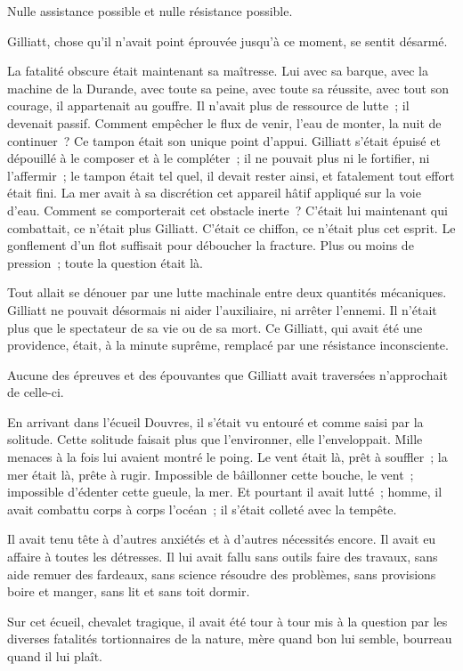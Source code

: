 \documentclass[french,twoside]{book} %
\begin{document}
Nulle assistance possible et nulle résistance possible.\par
 Gilliatt, chose qu’il n’avait point éprouvée jusqu’à ce moment, se sentit désarmé.\par
La fatalité obscure était maintenant sa maîtresse. Lui avec sa barque, avec la machine de la Durande, avec toute sa peine, avec toute sa réussite, avec tout son courage, il appartenait au gouffre. Il n’avait plus de ressource de lutte ; il devenait passif. Comment empêcher le flux de venir, l’eau de monter, la nuit de continuer ? Ce tampon était son unique point d’appui. Gilliatt s’était épuisé et dépouillé à le composer et à le compléter ; il ne pouvait plus ni le fortifier, ni l’affermir ; le tampon était tel quel, il devait rester ainsi, et fatalement tout effort était fini. La mer avait à sa discrétion cet appareil hâtif appliqué sur la voie d’eau. Comment se comporterait cet obstacle inerte ? C’était lui maintenant qui combattait, ce n’était plus Gilliatt. C’était ce chiffon, ce n’était plus cet esprit. Le gonflement d’un flot suffisait pour déboucher la fracture. Plus ou moins de pression ; toute la question était là.\par
Tout allait se dénouer par une lutte machinale entre deux quantités mécaniques. Gilliatt ne pouvait désormais ni aider l’auxiliaire, ni arrêter l’ennemi. Il n’était plus que le spectateur de sa vie ou de sa mort. Ce Gilliatt, qui avait été une providence, était, à la minute suprême, remplacé par une résistance inconsciente.\par
Aucune des épreuves et des épouvantes que Gilliatt avait traversées n’approchait de celle-ci.\par
En arrivant dans l’écueil Douvres, il s’était vu entouré et comme saisi par la solitude. Cette solitude  faisait plus que l’environner, elle l’enveloppait. Mille menaces à la fois lui avaient montré le poing. Le vent était là, prêt à souffler ; la mer était là, prête à rugir. Impossible de bâillonner cette bouche, le vent ; impossible d’édenter cette gueule, la mer. Et pourtant il avait lutté ; homme, il avait combattu corps à corps l’océan ; il s’était colleté avec la tempête.\par
Il avait tenu tête à d’autres anxiétés et à d’autres nécessités encore. Il avait eu affaire à toutes les détresses. Il lui avait fallu sans outils faire des travaux, sans aide remuer des fardeaux, sans science résoudre des problèmes, sans provisions boire et manger, sans lit et sans toit dormir.\par
Sur cet écueil, chevalet tragique, il avait été tour à tour mis à la question par les diverses fatalités tortionnaires de la nature, mère quand bon lui semble, bourreau quand il lui plaît.\par
\end{document}
